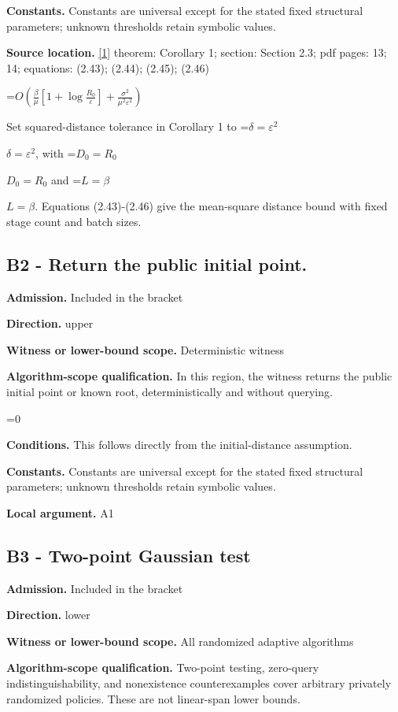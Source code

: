 \documentclass[10pt,a4paper]{article}
\newcommand{\AtlasMath}[1]{\par\begingroup\centering\setbox0=\hbox{$\displaystyle #1$}\ifdim\wd0>1.4\linewidth\typeout{ATLAS WIDE FORMULA: \the\wd0}\fi\ifdim\wd0>\linewidth\resizebox{\linewidth}{!}{\box0}\else\box0\fi\par\endgroup}
\newcommand{\AtlasInlineMath}[1]{\begingroup\setbox0=\hbox{$#1$}\ifdim\wd0>.4\linewidth\endgroup\AtlasMath{#1}\else\endgroup$#1$\fi}
\begin{document}
\textbf{Constants.} Constants are universal except for the stated fixed structural parameters; unknown thresholds retain symbolic values.

\textbf{Source location.} \href{https://arxiv.org/pdf/2609.04188v2}{[1]} theorem: Corollary 1; section: Section 2.3; pdf pages: 13; 14; equations: (2.43); (2.44); (2.45); (2.46)

\AtlasMath{O\!\left(\frac{\beta}{\mu}\left[1+\log\frac{R_0}{\varepsilon}\right]+\frac{\sigma^2}{\mu^2\varepsilon^2}\right)}
Set squared-distance tolerance in Corollary 1 to \AtlasInlineMath{\delta=\varepsilon^2}, with \AtlasInlineMath{D_0=R_0} and \AtlasInlineMath{L=\beta}. Equations (2.43)-(2.46) give the mean-square distance bound with fixed stage count and batch sizes.

\subsection{B2 - Return the public initial point.}
\textbf{Admission.} Included in the bracket

\textbf{Direction.} upper

\textbf{Witness or lower-bound scope.} Deterministic witness

\textbf{Algorithm-scope qualification.} In this region, the witness returns the public initial point or known root, deterministically and without querying.

\AtlasMath{0}
\textbf{Conditions.} This follows directly from the initial-distance assumption.

\textbf{Constants.} Constants are universal except for the stated fixed structural parameters; unknown thresholds retain symbolic values.

\textbf{Local argument.} A1

\subsection{B3 - Two-point Gaussian test}
\textbf{Admission.} Included in the bracket

\textbf{Direction.} lower

\textbf{Witness or lower-bound scope.} All randomized adaptive algorithms

\textbf{Algorithm-scope qualification.} Two-point testing, zero-query indistinguishability, and nonexistence counterexamples cover arbitrary privately randomized policies. These are not linear-span lower bounds.
\end{document}
